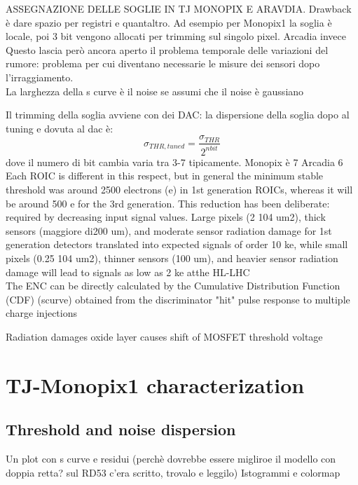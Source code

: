 ASSEGNAZIONE DELLE SOGLIE IN TJ MONOPIX E ARAVDIA.
Drawback è dare spazio per registri e quantaltro. Ad esempio per Monopix1 la soglia è locale, poi 3 bit vengono allocati per trimming sul singolo pixel.
Arcadia invece 
Questo lascia però ancora aperto il problema temporale delle variazioni del rumore:
problema per cui diventano necessarie le misure dei sensori dopo l'irraggiamento.\\



La larghezza della s curve è il noise se assumi che il noise è gaussiano


Il trimming della soglia avviene con dei DAC: la dispersione della soglia dopo al tuning e dovuta al dac è: 
\begin{equation}
    \sigma_{THR, tuned} = \frac{\sigma_{THR}}{2^{n bit}}
\end{equation}
dove il numero di bit cambia varia tra 3-7 tipicamente. Monopix è 7 Arcadia 6\\

Each ROIC is different in this respect, but in general the minimum stable threshold was around 2500 electrons (e) in 1st generation ROICs, whereas it will be around 500 e for the 3rd generation. This reduction has been deliberate: required by decreasing input signal values. Large pixels (2  104 um2), thick sensors (maggiore di200 um), and moderate sensor radiation damage for 1st generation detectors translated into expected signals of order 10 ke, while small pixels (0.25  104 um2), thinner sensors (100 um), and heavier sensor radiation damage will lead to signals as low as 2 ke atthe HL-LHC\\
The ENC can be directly calculated by the Cumulative Distribution Function (CDF) (scurve) obtained from the discriminator "hit" pulse response to multiple charge injections

Radiation damages oxide layer causes shift of MOSFET threshold voltage
\section{TJ-Monopix1 characterization}

    \subsection{Threshold and noise dispersion}
    Un plot con s curve e residui (perchè dovrebbe essere migliroe il modello con doppia retta? sul RD53 c'era scritto, trovalo e leggilo)
    Istogrammi e colormap\\
    
